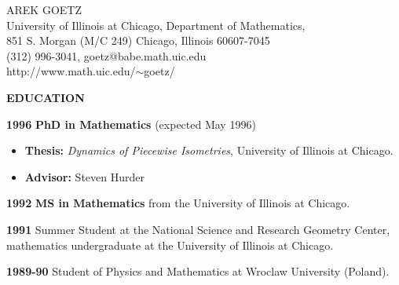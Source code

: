 \voffset=-1.2in
\hoffset=-0.9in
\setlength{\textheight}{10.750in}
\setlength{\textwidth}{7.1in}
\baselineskip=1in

\begin{center}
 {\Large    AREK GOETZ}
\\
{\scriptsize University of Illinois at Chicago, Department of Mathematics,\\
851 S. Morgan (M/C 249) Chicago, Illinois 60607-7045\\
(312) 996-3041, goetz@babe.math.uic.edu\\  http://www.math.uic.edu/$\sim$goetz/\\}
\end{center}


 
\hspace{-.29in}
 {\bf  EDUCATION }
\vspace{-.09in}
 \begin{list}{name}{ 18em \leftmargin .93in \itemsep -.025in }

\item [\bf 1996] {\bf PhD in  Mathematics} (expected May 1996)
\begin{itemize}
\vspace{-.04in}
\item  {\bf  Thesis:} {\em Dynamics of Piecewise Isometries}, University of Illinois at Chicago. 
\hspace{-.29in}
\vspace{-.04in}
 \item {\bf  Advisor:} Steven Hurder


\end{itemize} 
 \item [\bf 1992] {\bf MS in  Mathematics} from the University of Illinois at Chicago. 
 \item  [\bf 1991]  Summer Student at the National Science  and   
                     Research Geometry Center, \vspace{-.032in} \\  mathematics undergraduate at the University of Illinois at Chicago. 
\item   [\bf 1989-90]  Student  of  Physics and Mathematics at  Wroclaw University (Poland).
\end{list}
\vspace {.16in}

